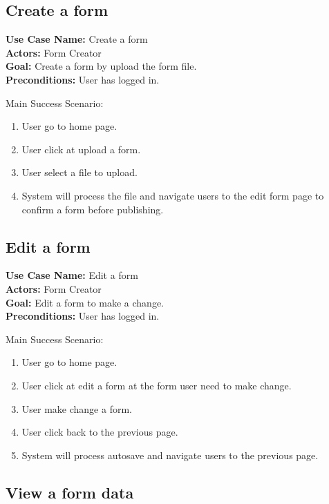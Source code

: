 \documentclass[12pt,oneside,openright,a4paper]{cpe-english-project}
\begin{document}
\subsection{Create a form}

\noindent\textbf{Use Case Name:} Create a form \\
\textbf{Actors:} Form Creator\\
\textbf{Goal:} Create a form by upload the form file. \\
\textbf{Preconditions:} User has logged in.

Main Success Scenario: 

\begin{enumerate}
    \item User go to home page.
    \item User click at upload a form.
    \item User select a file to upload.
    \item System will process the file and navigate users to the edit form page to confirm a form before publishing.
   
\end{enumerate}

\subsection{Edit a form}

\noindent\textbf{Use Case Name:} Edit a form \\
\textbf{Actors:} Form Creator\\
\textbf{Goal:} Edit a form to make a change.\\
\textbf{Preconditions:} User has logged in.

Main Success Scenario: 

\begin{enumerate}
    \item User go to home page.
    \item User click at edit a form at the form user need to make change.
    \item User make change a form.
    \item User click back to the previous page.
    \item System will process autosave and navigate users to the previous page.
\end{enumerate}


\subsection{View a form data}
\end{document}
